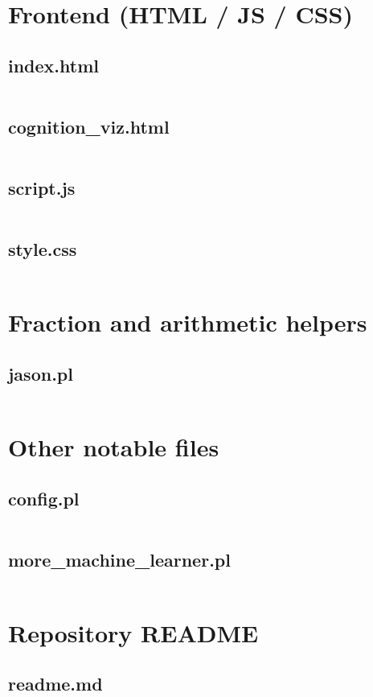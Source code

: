\documentclass{article}
\begin{document}
\section{Frontend (HTML / JS / CSS)}
\subsection{index.html}
\inputminted{html}{index.html}
\subsection{cognition\_viz.html}
\inputminted{html}{cognition_viz.html}
\subsection{script.js}
\inputminted{javascript}{script.js}
\subsection{style.css}
\inputminted{css}{style.css}

\section{Fraction and arithmetic helpers}
\subsection{jason.pl}
\inputminted{prolog}{jason.pl}

\section{Other notable files}
\subsection{config.pl}
\inputminted{prolog}{config.pl}
\subsection{more\_machine\_learner.pl}
\inputminted{prolog}{more_machine_learner.pl}

\section{Repository README}
\subsection{readme.md}
\inputminted{markdown}{readme.md}

\end{document}

